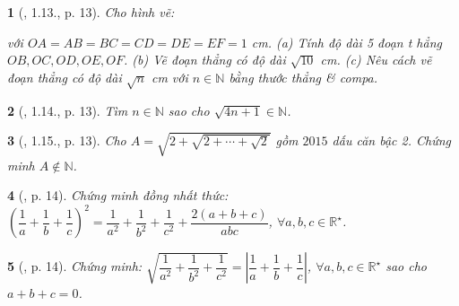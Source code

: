 \documentclass{article}
\newtheorem{baitoan}{}%
\begin{document}
\begin{baitoan}[\cite{Binh_boi_duong_Toan_9_tap_1}, 1.13., p. 13]
	Cho hình vẽ:
	\begin{center}
	\end{center}
	với $OA = AB = BC = CD = DE = EF = 1$ {\rm cm}. (a) Tính độ dài 5 đoạn t hẳng $OB,OC,OD,OE,OF$. (b) Vẽ đoạn thẳng có độ dài $\sqrt{10}$ {\rm cm}. (c) Nêu cách vẽ đoạn thẳng có độ dài $\sqrt{n}$ {\rm cm} với $n\in\mathbb{N}$ bằng thước thẳng \& compa.
\end{baitoan}

\begin{baitoan}[\cite{Binh_boi_duong_Toan_9_tap_1}, 1.14., p. 13]
	Tìm $n\in\mathbb{N}$ sao cho $\sqrt{4n + 1}\in\mathbb{N}$.
\end{baitoan}

\begin{baitoan}[\cite{Binh_boi_duong_Toan_9_tap_1}, 1.15., p. 13]
	Cho $A = \sqrt{2 + \sqrt{2 + \cdots + \sqrt{2}}}$ gồm $2015$ dấu căn bậc 2. Chứng minh $A\notin\mathbb{N}$.
\end{baitoan}

\begin{baitoan}[\cite{Binh_boi_duong_Toan_9_tap_1}, p. 14]
	Chứng minh đồng nhất thức: $\left(\dfrac{1}{a} + \dfrac{1}{b} + \dfrac{1}{c}\right)^2 = \dfrac{1}{a^2} + \dfrac{1}{b^2} + \dfrac{1}{c^2} + \dfrac{2(a + b + c)}{abc}$, $\forall a,b,c\in\mathbb{R}^\star$.
\end{baitoan}

\begin{baitoan}[\cite{Binh_boi_duong_Toan_9_tap_1}, p. 14]
	Chứng minh: $\sqrt{\dfrac{1}{a^2} + \dfrac{1}{b^2} + \dfrac{1}{c^2}} = \left|\dfrac{1}{a} + \dfrac{1}{b} + \dfrac{1}{c}\right|$, $\forall a,b,c\in\mathbb{R}^\star$ sao cho $a + b + c = 0$.
\end{baitoan}
\end{document}
